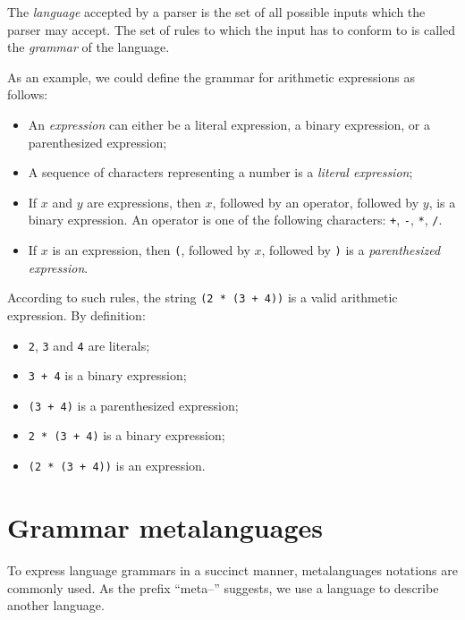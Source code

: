 \documentclass[11pt, american, draft]{PhdThesis}
\begin{document}
  The \emph{language} accepted by a parser is the set of all possible inputs which the parser may
  accept. The set of rules to which the input has to conform to is called the \emph{grammar} of the
  language.

  As an example, we could define the grammar for arithmetic expressions as follows:

  \begin{itemize}[noitemsep,topsep=0pt]
    \item An \emph{expression} can either be a literal expression, a binary expression, or a
          parenthesized expression;

    \item A sequence of characters representing a number is a \emph{literal expression};

    \item If $x$ and $y$ are expressions, then $x$, followed by an operator, followed by $y$, is a
          binary expression. An operator is one of the following characters: \texttt{+}, \texttt{-},
          \texttt{*}, \texttt{/}.
    
    \item If $x$ is an expression, then \texttt{(}, followed by $x$, followed by \texttt{)} is a
          \emph{parenthesized expression}.
  \end{itemize}
  
  According to such rules, the string \mbox{\texttt{(2 * (3 + 4))}} is a valid arithmetic
  expression. By definition:

  \begin{itemize}[noitemsep,topsep=0pt]
    \item \texttt{2}, \texttt{3} and \texttt{4} are literals;
    \item \mbox{\texttt{3 + 4}} is a binary expression;
    \item \mbox{\texttt{(3 + 4)}} is a parenthesized expression;
    \item \mbox{\texttt{2 * (3 + 4)}} is a binary expression;
    \item \mbox{\texttt{(2 * (3 + 4))}} is an expression.
  \end{itemize}

  \section{Grammar metalanguages}

  To express language grammars in a succinct manner, metalanguages notations are commonly used. As
  the prefix ``meta--'' suggests, we use a language to describe another language.
\end{document}
